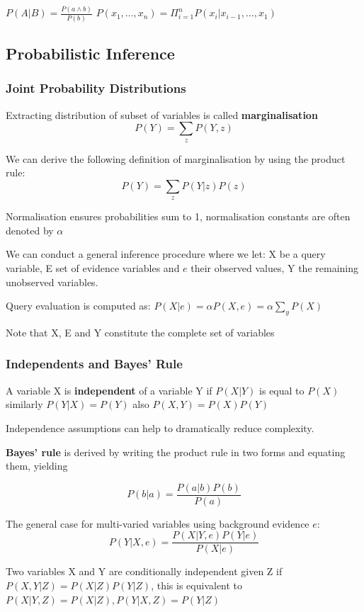 \documentclass{article}
\begin{document}
$P(A|B) = \frac{P(a \wedge b)}{P(b)}$
$P(x_1, \ldots, x_n) = \Pi_{i=1}^n P(x_i | x_{i-1},\ldots, x_1)$

\subsection{Probabilistic Inference}

\subsubsection{Joint Probability Distributions}

Extracting distribution of subset of variables is called \textbf{marginalisation} $$P(Y) = \sum_z P(Y, z)$$

We can derive the following definition of marginalisation by using the product rule: $$P(Y) = \sum_z P(Y|z)P(z)$$

Normalisation ensures probabilities sum to 1, normalisation constants are often denoted by $\alpha$

We can conduct a general inference procedure where we let: X be a query variable, E set of evidence variables and $e$ their observed values, Y the remaining unobserved variables. 

Query evaluation is computed as: $P(X|e) = \alpha P(X, e) = \alpha \sum_y P(X)$

Note that X, E and Y constitute the complete set of variables

\subsubsection{Independents and Bayes' Rule}

A variable X is \textbf{independent} of a variable Y if $P(X|Y)$ is equal to $P(X)$ similarly $P(Y|X) = P(Y)$ also $P(X,Y) = P(X)P(Y)$ 

Independence assumptions can help to dramatically reduce complexity. 

\textbf{Bayes' rule} is derived by writing the product rule in two forms and equating them, yielding 

$$P(b|a) = \frac{P(a|b)P(b)}{P(a)}$$

The general case for multi-varied variables using background evidence $e$: $$P(Y|X,e) = \frac{P(X|Y,e)P(Y|e)}{P(X|e)}$$

Two variables X and Y are conditionally independent given Z if $P(X,Y|Z) = P(X|Z)P(Y|Z)$, this is equivalent to $P(X|Y,Z) = P(X|Z), P(Y|X,Z) = P(Y|Z)$
\end{document}
